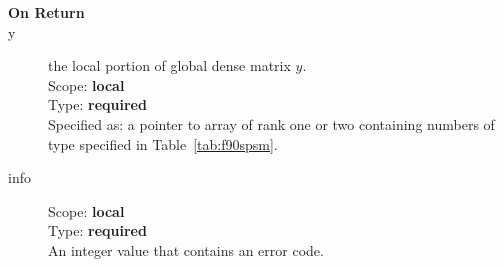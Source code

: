 \begin{description}
\item[\bf On Return] 
\item[y] the local portion of global dense matrix
$y$. %
\\
Scope: {\bf local} \\
Type: {\bf required} \\
Specified as: a pointer to array of rank one or two
containing numbers of type specified in
Table~\ref{tab:f90spsm}.
\item[info] 
Scope: {\bf local} \\
Type: {\bf required} \\
An integer value that contains an error code. 
\end{description}





